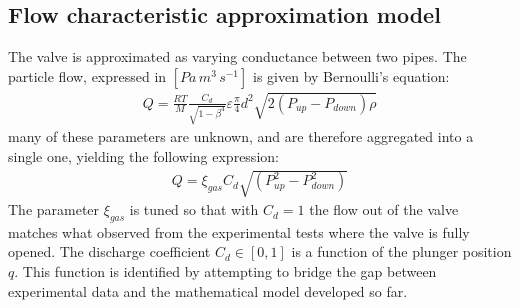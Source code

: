 \documentclass[letterpaper, 10pt, conference]{ieeeconf}
\begin{document}
\subsection{Flow characteristic approximation model}
The valve is approximated as varying conductance between two pipes. The particle flow, expressed in $[\unit{Pa\,m^{3}\,s^{-1}}]$ is given by Bernoulli's equation:
\begin{align}
    Q = \frac{RT}{M} \frac{C_d}{\sqrt{1-\beta^4}}\varepsilon\frac{\pi}{4}d^2\sqrt{2(P_{up}-P_{down})\rho}
\end{align}
many of these parameters are unknown, and are therefore aggregated into a single one, yielding the following expression:
\begin{align}
    Q = \xi_{gas}C_d\sqrt{\left(P_{up}^2-P_{down}^2\right)}
\end{align}
The parameter $\xi_{gas}$ is tuned so that with $C_d=1$ the flow out of the valve matches what observed from the experimental tests where the valve is fully opened. 
The discharge coefficient $C_d\in[0,1]$ is a function of the plunger position $q$. This function is identified by attempting to bridge the gap between experimental data and the mathematical model developed so far.
\end{document}
